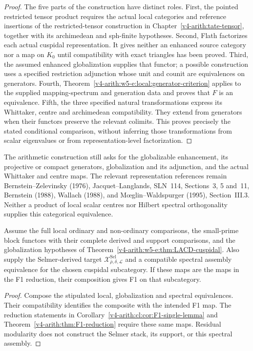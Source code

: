 \begin{proof}
The five parts of the construction have distinct roles.
First, the pointed restricted tensor product requires the actual local
categories and reference insertions of the restricted-tensor
construction in Chapter~\ref{v4-arith:tate-tensor}, together with its
archimedean and sph-finite hypotheses. Second, Flath factorizes each
actual cuspidal representation. It gives neither an enhanced source
category nor a map on $K_0$ until compatibility with exact triangles
has been proved. Third, the assumed enhanced globalization supplies
that functor; a possible construction uses a specified restriction
adjunction whose unit and counit are equivalences on generators.
Fourth, Theorem~\ref{v4-arith:w5-e:local:generator-criterion} applies
to the supplied mapping-spectrum and generation data and proves that
$F$ is an equivalence. Fifth, the three specified natural
transformations express its Whittaker, centre and archimedean
compatibility. They extend from generators when their functors preserve
the relevant colimits. This proves precisely the stated conditional
comparison, without inferring those transformations from scalar
eigenvalues or from representation-level factorization.
\end{proof}

The arithmetic construction still asks for the globalizable enhancement,
its projective or compact generators, globalization and its adjunction,
and the actual Whittaker and centre maps. The relevant representation
references remain Bernstein--Zelevinsky (1976), Jacquet--Langlands,
SLN~114, Sections~3, 5 and~11, Bernstein (1988), Wallach (1988), and
M\oe glin--Waldspurger (1995), Section~III.3. Neither a product of
local scalar centres nor Hilbert spectral orthogonality supplies
this categorical equivalence.

\begin{corollary}
\label{v4-arith:w5-e:cor:F1-cuspidal}
Assume the full local ordinary and non-ordinary comparisons, the
small-prime block functors with their complete derived and support
comparisons, and the globalization hypotheses of
Theorem~\ref{v4-arith:w5-e:thm:LACD-cuspidal}. Also supply the
Selmer-derived target
$\mathcal X^{\mathrm{Sel}}_{\bar\rho,\delta,\mathcal L}$ and a
compatible spectral assembly equivalence for the chosen cuspidal
subcategory. If these maps are the maps in the F1 reduction, their
composition gives F1 on that subcategory.
\end{corollary}
\begin{proof}
Compose the stipulated local, globalization and spectral equivalences.
Their compatibility identifies the composite with the intended F1 map.
The reduction statements in
Corollary~\ref{v4-arith:cl:cor:F1-single-lemma} and
Theorem~\ref{v4-arith:thm:F1-reduction} require these same maps.
Residual modularity does not construct the Selmer stack, its support,
or this spectral assembly.
\end{proof}

